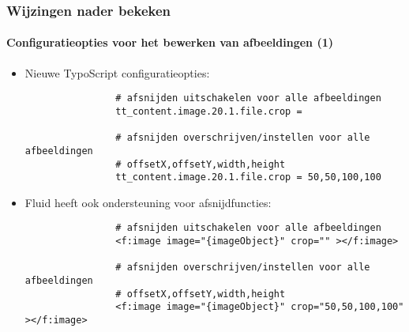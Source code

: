 \begin{frame}[fragile]
	\frametitle{Wijzingen nader bekeken}
	\framesubtitle{Configuratieopties voor het bewerken van afbeeldingen (1)}

	\begin{itemize}
		\item Nieuwe TypoScript configuratieopties:
			\begin{lstlisting}
				# afsnijden uitschakelen voor alle afbeeldingen
				tt_content.image.20.1.file.crop =

				# afsnijden overschrijven/instellen voor alle afbeeldingen
				# offsetX,offsetY,width,height
				tt_content.image.20.1.file.crop = 50,50,100,100
			\end{lstlisting}

		\item Fluid heeft ook ondersteuning voor afsnijdfuncties:
			\begin{lstlisting}
				# afsnijden uitschakelen voor alle afbeeldingen
				<f:image image="{imageObject}" crop="" ></f:image>

				# afsnijden overschrijven/instellen voor alle afbeeldingen
				# offsetX,offsetY,width,height
				<f:image image="{imageObject}" crop="50,50,100,100" ></f:image>
			\end{lstlisting}

	\end{itemize}

\end{frame}

